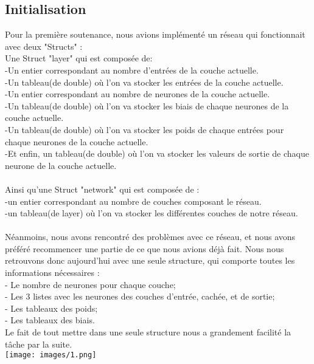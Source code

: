 \documentclass[14pt]{article}
\begin{document}
\subsection{Initialisation}
Pour la première soutenance, nous avions implémenté un réseau qui fonctionnait avec deux "Structs" :\\
Une Struct "layer" qui est composée de:\\
-Un entier correspondant au nombre d'entrées de la couche actuelle.\\
-Un tableau(de double) où l'on va stocker les entrées de la couche actuelle.\\
-Un entier correspondant au nombre de neurones de la couche actuelle.\\
-Un tableau(de double) où l'on va stocker les biais de chaque neurones de la couche actuelle.\\
-Un tableau(de double) où l'on va stocker les poids de chaque entrées pour chaque neurones de la couche actuelle.\\
-Et enfin, un tableau(de double) où l'on va stocker les valeurs de sortie de chaque neurone de la couche actuelle.\\
\\
\newpage
Ainsi qu'une Struct "network" qui est composée de :\\
-un entier correspondant au nombre de couches composant le réseau.\\
-un tableau(de layer) où l'on va stocker les différentes couches de notre réseau.\\
\\
Néanmoins, nous avons rencontré des problèmes avec ce réseau, et nous avons préféré recommencer une partie de ce que nous avions déjà fait. Nous nous retrouvons donc aujourd'hui avec une seule structure, qui comporte toutes les informations nécessaires :\\
- Le nombre de neurones pour chaque couche;\\
\newline
- Les 3 listes avec les neurones des couches d'entrée, cachée, et de sortie;\\
\newline
- Les tableaux des poids;\\
\newline
- Les tableaux des biais.\\
\newline
Le fait de tout mettre dans une seule structure nous a grandement facilité la tâche par la suite.\\
\newline
\texttt{[image: images/1.png]}
\newpage
\end{document}
